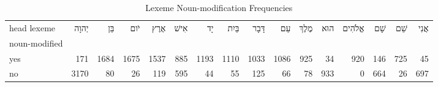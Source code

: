 \begin{table}[htbp!]
\centering
\caption{Lexeme Noun-modification Frequencies}
\label{table:all_nounmod_ct}
\begin{adjustbox}{width=1\textwidth}
\begin{tabular}{lrrrrrrrrrrrrrrr}
\toprule
head lexeme &  \texthebrew{יְהוָה} &  \texthebrew{בֵּן} &  \texthebrew{יֹום} &  \texthebrew{אֶרֶץ} &  \texthebrew{אִישׁ} &  \texthebrew{יָד} &  \texthebrew{בַּיִת} &  \texthebrew{דָּבָר} &  \texthebrew{עַם} &  \texthebrew{מֶלֶךְ} &  \texthebrew{הוּא} &  \texthebrew{אֱלֹהִים} &  \texthebrew{שָׁם} &  \texthebrew{שֵׁם} &  \texthebrew{אֲנִי} \\
noun-modified &                      &                    &                    &                     &                     &                   &                      &                      &                   &                      &                    &                        &                    &                    &                     \\
\midrule
yes           &                  171 &               1684 &               1675 &                1537 &                 885 &              1193 &                 1110 &                 1033 &              1086 &                  925 &                 34 &                    920 &                146 &                725 &                  45 \\
no            &                 3170 &                 80 &                 26 &                 119 &                 595 &                44 &                   55 &                  125 &                66 &                   78 &                933 &                      0 &                664 &                 26 &                 697 \\
\bottomrule
\end{tabular}
\end{adjustbox}
\end{table}
